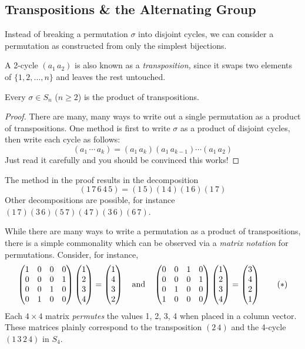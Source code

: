 \clearpage

\subsection{Transpositions \& the Alternating Group}\label{sec:transpositions}

Instead of breaking a permutation $\sigma$ into disjoint cycles, we can consider a permutation as constructed from only the simplest bijections.

\begin{defn}{}{}
A 2-cycle $(a_1\,a_2)$ is also known as a \emph{transposition,} since it swaps two elements of $\{1,2,\ldots,n\}$ and leaves the rest untouched.
\end{defn}


\begin{thm}{}{}
Every $\sigma\in S_n$ ($n\ge 2$) is the product of transpositions.
\end{thm}

\begin{proof}
There are many, many ways to write out a single permutation as a product of transpositions. One method is first to write $\sigma$ as a product of disjoint cycles, then write each cycle as follows:
\[(a_1\,\cdots\, a_k)=(a_1\,a_k)(a_1\,a_{k-1})\cdots (a_1\,a_2)\]
Just read it carefully and you should be convinced this works!
\end{proof}

\begin{example}{}{}
The method in the proof results in the decomposition
\[(1\,7\,6\,4\,5)=(1\,5)(1\,4)(1\,6)(1\,7)\]
Other decompositions are possible, for instance $(1\,7)(3\,6)(5\,7)(4\,7)(3\,6)(6\,7)$.
\end{example}

While there are many ways to write a permutation as a product of transpositions, there is a simple commonality which can be observed via a \emph{matrix notation} for permutations. Consider, for instance,
\[
	\begin{pmatrix}
		1&0&0&0\\ 0&0&0&1\\ 0&0&1&0\\ 0&1&0&0
	\end{pmatrix}
	\begin{pmatrix}1\\2\\3\\4\end{pmatrix}
	=\begin{pmatrix}1\\4\\3\\2\end{pmatrix}\quad\text{and}\quad
	\begin{pmatrix}
		0&0&1&0\\ 0&0&0&1\\  0&1&0&0\\ 1&0&0&0
	\end{pmatrix}
	\begin{pmatrix}1\\2\\3\\4\end{pmatrix}
	=\begin{pmatrix}3\\4\\2\\1\end{pmatrix}\tag{$\ast$}
\] 
Each $4\times 4$ matrix \emph{permutes} the values 1, 2, 3, 4 when placed in a column vector. These matrices plainly correspond to the transposition $(2\,4)$ and the 4-cycle $(1\,3\,2\,4)$ in $S_4$.

